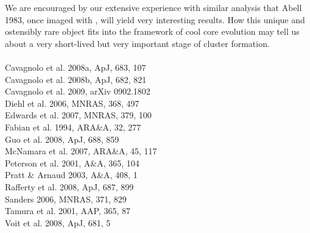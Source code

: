 \documentclass[letterpaper,11pt,twocolumn]{article}
\begin{document}
We are encouraged by our extensive experience with similar analysis
that Abell 1983, once imaged with \chandra, will yield very
interesting results. How this unique and ostensibly rare object fits
into the framework of cool core evolution may tell us about a very
short-lived but very important stage of cluster formation.\\

\\
Cavagnolo et al. 2008a, ApJ, 683, 107\\
Cavagnolo et al. 2008b, ApJ, 682, 821\\
Cavagnolo et al. 2009, arXiv 0902.1802\\
Diehl et al. 2006, MNRAS, 368, 497\\
Edwards et al. 2007, MNRAS, 379, 100\\
Fabian et al. 1994, ARA\&A, 32, 277\\
Guo et al. 2008, ApJ, 688, 859\\
McNamara et al. 2007, ARA\&A, 45, 117\\
Peterson et al. 2001, A\&A, 365, 104\\
Pratt \& Arnaud 2003, A\&A, 408, 1\\
Rafferty et al. 2008, ApJ, 687, 899\\
Sanders 2006, MNRAS, 371, 829\\
Tamura et al. 2001, AAP, 365, 87\\
Voit et al. 2008, ApJ, 681, 5
\end{document}
